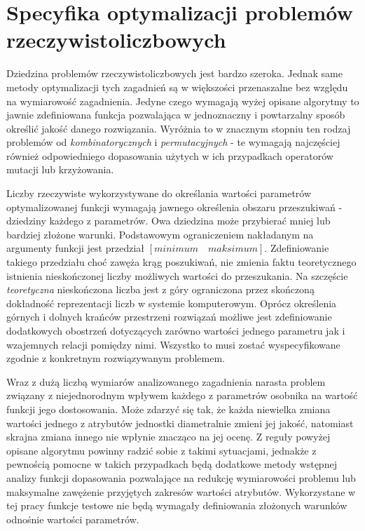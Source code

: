 \section{Specyfika optymalizacji problemów rzeczywistoliczbowych}
\label{sec:specyfika_optymalizacji_problemów_rzeczywistoliczbowych}
\par
Dziedzina problemów rzeczywistoliczbowych jest bardzo szeroka. Jednak same metody optymalizacji tych zagadnień są w większości przenaszalne bez względu na wymiarowość zagadnienia. Jedyne czego wymagają wyżej opisane algorytmy to jawnie zdefiniowana funkcja pozwalająca w jednoznaczny i powtarzalny sposób określić jakość danego rozwiązania. Wyróżnia to w znacznym stopniu ten rodzaj problemów od \emph{kombinatorycznych} i \emph{permutacyjnych} - te wymagają najczęściej również odpowiedniego dopasowania użytych w ich przypadkach operatorów mutacji lub krzyżowania.
\par
Liczby rzeczywiste wykorzystywane do określania wartości parametrów optymalizowanej funkcji wymagają jawnego określenia obszaru przeszukiwań - dziedziny każdego z parametrów. Owa dziedzina może przybierać mniej lub bardziej złożone warunki. Podstawowym ograniczeniem nakładanym na argumenty funkcji jest przedział $[minimum \quad maksimum]$. Zdefiniowanie takiego przedziału choć zawęża krąg poszukiwań, nie zmienia faktu teoretycznego istnienia nieskończonej liczby możliwych wartości do przeszukania. Na szczęście \emph{teoretyczna} nieskończona liczba jest z góry ograniczona przez skończoną dokładność reprezentacji liczb w systemie komputerowym. Oprócz określenia górnych i dolnych krańców przestrzeni rozwiązań możliwe jest zdefiniowanie dodatkowych obostrzeń dotyczących zarówno wartości jednego parametru jak i wzajemnych relacji pomiędzy nimi. Wszystko to musi zostać wyspecyfikowane zgodnie z konkretnym rozwiązywanym problemem.
\par
Wraz z dużą liczbą wymiarów analizowanego zagadnienia narasta problem związany z niejednorodnym wpływem każdego z parametrów osobnika na wartość funkcji jego dostosowania. Może zdarzyć się tak, że każda niewielka zmiana wartości jednego z atrybutów jednostki diametralnie zmieni jej jakość, natomiast skrajna zmiana innego nie wpłynie znacząco na jej ocenę. Z reguły powyżej opisane algorytmu powinny radzić sobie z takimi sytuacjami, jednakże z pewnością pomocne w takich przypadkach będą dodatkowe metody wstępnej analizy funkcji dopasowania pozwalające na redukcję wymiarowości problemu lub maksymalne zawężenie przyjętych zakresów wartości atrybutów. Wykorzystane w tej pracy funkcje testowe nie będą wymagały definiowania złożonych warunków odnośnie wartości parametrów. 


